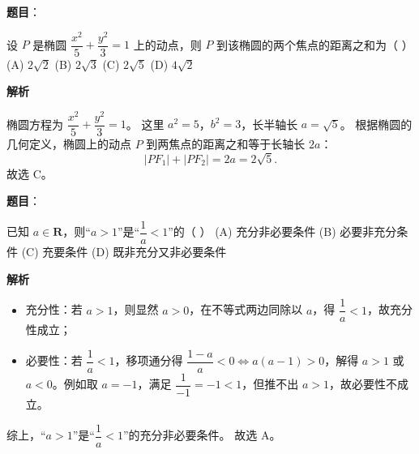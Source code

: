 \begin{answer}

\textbf{题目}：

设 $P$ 是椭圆 $\dfrac{x^2}{5} + \dfrac{y^2}{3} = 1$ 上的动点，则 $P$ 到该椭圆的两个焦点的距离之和为（ ）
(A) $2\sqrt{2}$
(B) $2\sqrt{3}$
(C) $2\sqrt{5}$
(D) $4\sqrt{2}$

\textbf{解析}

椭圆方程为 $\dfrac{x^2}{5} + \dfrac{y^2}{3} = 1$。
这里 $a^2 = 5$，$b^2 = 3$，长半轴长 $a = \sqrt{5}$。
根据椭圆的几何定义，椭圆上的动点 $P$ 到两焦点的距离之和等于长轴长 $2a$：
\nopagebreak[4]
\[|PF_1| + |PF_2| = 2a = 2\sqrt{5}.\]
故选 C。


\end{answer}
\begin{answer}

\textbf{题目}：

已知 $a \in \mathbf{R}$，则“$a > 1$”是“$\dfrac{1}{a} < 1$”的（ ）
(A) 充分非必要条件
(B) 必要非充分条件
(C) 充要条件
(D) 既非充分又非必要条件

\textbf{解析}

\begin{itemize}
\item 充分性：若 $a > 1$，则显然 $a > 0$，在不等式两边同除以 $a$，得 $\dfrac{1}{a} < 1$，故充分性成立；
\item 必要性：若 $\dfrac{1}{a} < 1$，移项通分得 $\dfrac{1 - a}{a} < 0 \iff a(a - 1) > 0$，解得 $a > 1$ 或 $a < 0$。例如取 $a = -1$，满足 $\dfrac{1}{-1} = -1 < 1$，但推不出 $a > 1$，故必要性不成立。
\end{itemize}
综上，“$a > 1$”是“$\dfrac{1}{a} < 1$”的充分非必要条件。
故选 A。


\end{answer}
